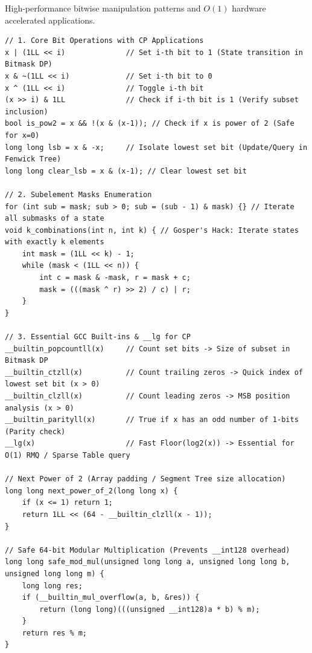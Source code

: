 
High-performance bitwise manipulation patterns and $O(1)$ hardware accelerated applications.

\begin{lstlisting}
// 1. Core Bit Operations with CP Applications
x | (1LL << i)              // Set i-th bit to 1 (State transition in Bitmask DP)
x & ~(1LL << i)             // Set i-th bit to 0
x ^ (1LL << i)              // Toggle i-th bit
(x >> i) & 1LL              // Check if i-th bit is 1 (Verify subset inclusion)
bool is_pow2 = x && !(x & (x-1)); // Check if x is power of 2 (Safe for x=0)
long long lsb = x & -x;     // Isolate lowest set bit (Update/Query in Fenwick Tree)
long long clear_lsb = x & (x-1); // Clear lowest set bit

// 2. Subelement Masks Enumeration
for (int sub = mask; sub > 0; sub = (sub - 1) & mask) {} // Iterate all submasks of a state
void k_combinations(int n, int k) { // Gosper's Hack: Iterate states with exactly k elements
    int mask = (1LL << k) - 1;
    while (mask < (1LL << n)) {
        int c = mask & -mask, r = mask + c;
        mask = (((mask ^ r) >> 2) / c) | r;
    }
}

// 3. Essential GCC Built-ins & __lg for CP
__builtin_popcountll(x)     // Count set bits -> Size of subset in Bitmask DP
__builtin_ctzll(x)          // Count trailing zeros -> Quick index of lowest set bit (x > 0)
__builtin_clzll(x)          // Count leading zeros -> MSB position analysis (x > 0)
__builtin_parityll(x)       // True if x has an odd number of 1-bits (Parity check)
__lg(x)                     // Fast Floor(log2(x)) -> Essential for O(1) RMQ / Sparse Table query

// Next Power of 2 (Array padding / Segment Tree size allocation)
long long next_power_of_2(long long x) {
    if (x <= 1) return 1;
    return 1LL << (64 - __builtin_clzll(x - 1));
}

// Safe 64-bit Modular Multiplication (Prevents __int128 overhead)
long long safe_mod_mul(unsigned long long a, unsigned long long b, unsigned long long m) {
    long long res;
    if (__builtin_mul_overflow(a, b, &res)) {
        return (long long)(((unsigned __int128)a * b) % m);
    }
    return res % m;
}
\end{lstlisting}
